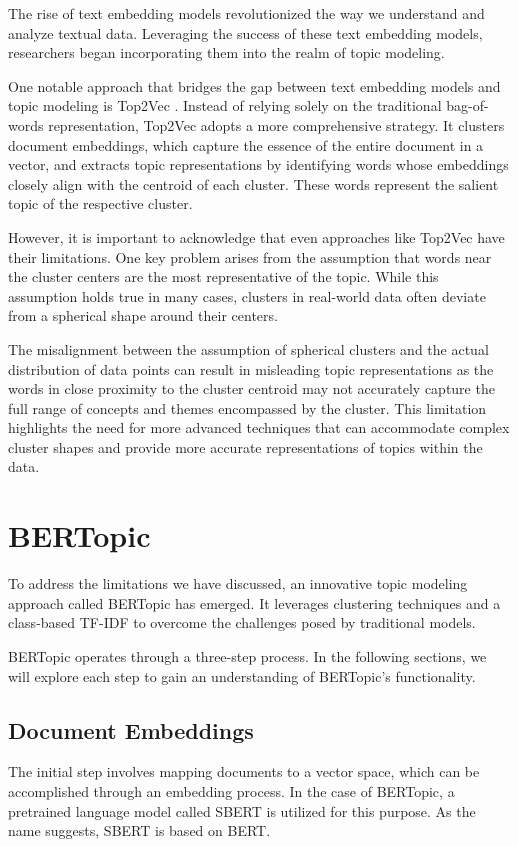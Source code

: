\documentclass[12pt,oneside,bibtotoc,liststotoc]{scrbook}
\begin{document}
The rise of text embedding models revolutionized the way we understand and analyze textual data. Leveraging the success of these text embedding models, researchers began incorporating them into the realm of topic modeling.

One notable approach that bridges the gap between text embedding models and topic modeling is Top2Vec \cite{TopToVec}. Instead of relying solely on the traditional bag-of-words representation, Top2Vec adopts a more comprehensive strategy. It clusters document embeddings, which capture the essence of the entire document in a vector, and extracts topic representations by identifying words whose embeddings closely align with the centroid of each cluster. These words represent the salient topic of the respective cluster.

However, it is important to acknowledge that even approaches like Top2Vec have their limitations. One key problem arises from the assumption that words near the cluster centers are the most representative of the topic. While this assumption holds true in many cases, clusters in real-world data often deviate from a spherical shape around their centers.

The misalignment between the assumption of spherical clusters and the actual distribution of data points can result in misleading topic representations as the words in close proximity to the cluster centroid may not accurately capture the full range of concepts and themes encompassed by the cluster. This limitation highlights the need for more advanced techniques that can accommodate complex cluster shapes and provide more accurate representations of topics within the data. \cite{bertopic}

\section{BERTopic}
To address the limitations we have discussed, an innovative topic modeling approach called BERTopic \cite{bertopic} has emerged. It leverages clustering techniques and a class-based TF-IDF to overcome the challenges posed by traditional models.

BERTopic operates through a three-step process. In the following sections, we will explore each step to gain an understanding of BERTopic's functionality.

\subsection{Document Embeddings}
The initial step involves mapping documents to a vector space, which can be accomplished through an embedding process. In the case of BERTopic, a pretrained language model called SBERT \cite{sbert} is utilized for this purpose. As the name suggests, SBERT is based on BERT.
\end{document}
